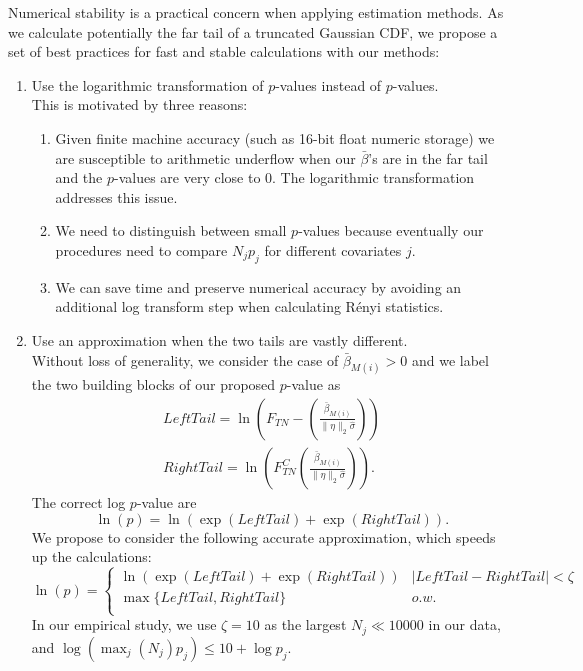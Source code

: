 \documentclass[11pt]{article}
\begin{document}
Numerical stability is a practical concern when applying estimation methods. As we calculate potentially the far tail of a truncated Gaussian CDF, we propose a set of best practices for fast and stable calculations with our methods:
\begin{enumerate}
	\item Use the logarithmic transformation of $p$-values instead of $p$-values.\\
	This is motivated by three reasons:
	\begin{enumerate}
		\item Given finite machine accuracy (such as 16-bit float numeric storage) we are susceptible to arithmetic underflow when our $\bar{\beta}$'s are in the far tail and the $p$-values are very close to 0. The logarithmic transformation addresses this issue.
		\item We need to distinguish between small $p$-values because eventually our procedures need to compare $N_jp_j$ for different covariates $j$.
		\item We can save time and preserve numerical accuracy by avoiding an additional log transform step when calculating R\'enyi statistics.
	\end{enumerate}
	\item Use an approximation when the two tails are vastly different.\\
	Without loss of generality, we consider the case of $\bar{\beta}_{M(i)}>0$ and we label the two building blocks of our proposed $p$-value as
	\begin{equation}
		\begin{split}
			LeftTail=\ln\left(F_{TN}-(
			\frac{\bar{\beta}_{M(i)}}{\|\eta\|_2\hat{\sigma}})\right)\\
			RightTail=\ln\left(
			F^C_{TN}(\frac{\bar{\beta}_{M(i)}}{\|\eta\|_2\hat{\sigma}})\right).
		\end{split}
	\end{equation}
	The correct log $p$-value are
	\begin{equation}
		\ln( p)=\ln\left(\exp(LeftTail)+\exp(RightTail)\right).
	\end{equation}
	We propose to consider the following accurate approximation, which speeds up the calculations:
	\begin{equation}
		\ln( p)=
		\begin{cases}
			\ln\left(\exp(LeftTail)+\exp(RightTail)\right) &|LeftTail-RightTail|<\zeta\\
			\max\{LeftTail,RightTail\} &o.w.\\
		\end{cases}
	\end{equation}
	In our empirical study, we use $\zeta=10$ as the largest $N_j\ll10000$ in our data, and $\log \left(\max_j(N_j)p_j\right)\leq 10+\log p_j$.
\end{enumerate}
\end{document}
